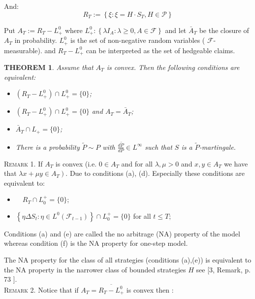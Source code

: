 \documentclass[review]{elsarticle}
\newtheorem{theorem}{THEOREM}
\begin{document}
And:
$$R_T:=\left\{\xi:  \xi=H \cdot S_T,  H \in \mathcal{P}\right\}$$




Put $A_T:=R_T-L_{+}^0$ where $L_{+}^0:\left\{\lambda I_A: \lambda\geq 0, A \in \mathcal{F}\right\}$ and let $\bar{A}_T$ be the closure of $A_T$ in probability.
 $L_{+}^0$ is the set of non-negative random variables ( $\mathcal{F}$-measurable). and $R_T-L_{+}^0$ can be interpreted as the set of hedgeable claims. 
    
\begin{theorem}
    

Assume that $A_T$ is convex. Then the following conditions are equivalent:
\begin{itemize}
    \item[(a)] $(R_T - L_+^0) \cap L_+^0 = \{0\}$;
    \item[(b)] $(R_T - L_+^0) \cap L_+^0 = \{0\}$ and $A_T = \bar{A}_T$;
    
    \item[(c)] $\bar{A}_T \cap L_+ = \{0\}$;
    \item[(d)] There is a probability $\tilde{P} \sim P$ with $\frac{d \tilde{P}}{d P} \in L^\infty$ such that $S$ is a $\tilde{P}$-martingale.
\end{itemize}

\end{theorem}

\hspace{0.5cm}\textsc{Remark 1.}
 If $A_T$ is convex (i.e. $0 \in A_T$ and for all $\lambda, \mu>0$ and $x, y \in A_T$ we have that $\left.\lambda x+\mu y \in A_T\right)$. 
Due to conditions (a), (d). Especially these conditions are equivalent to:
\begin{itemize}
    \item[(e)] $\quad R_T \cap L_0^{+}=\{0\}$;
    \item[(f)] $\left\{\eta \Delta S_t: \eta \in L^0\left(\mathcal{F}_{t-1}\right)\right\} \cap L_0^{+}=\{0\}$ for all $t \leq T$;
\end{itemize}    



Conditions (a) and (e) are called the no arbitrage (NA) property of the model whereas condition (f) is the NA property for one-step model.

The NA property for the class of all strategies (conditions (a),(e)) is equivalent to the NA property in the narrower class of bounded strategies $H$ see [3, Remark, p. 73 \cite{Kabanov2009}].\\
\hspace{0.5cm}\textsc{Remark 2.} Notice that if $A_T = \overline{R_T-L_{+}^0}$ is convex then :
\end{document}
